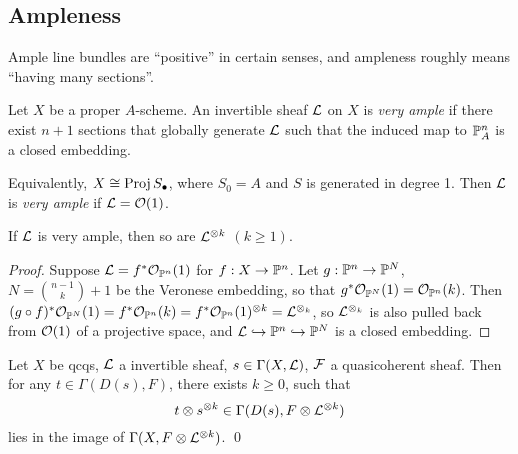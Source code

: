 \documentclass[11pt]{amsart}
\begin{document}
\subsection{Ampleness}

Ample line bundles are ``positive'' in certain senses, and ampleness roughly means ``having many sections''.

\begin{defn}
    Let $X$ be a proper $A$-scheme. An invertible sheaf $\mathcal{L}$ on $X$ is \emph{very ample} if there exist $n+1$ sections that globally generate $\mathcal{L}$ such that the induced map to $\mathbb{P}^n_A$ is a closed embedding. 
    
    Equivalently, $X \cong \operatorname{Proj} S_\bullet$, where $S_0=A$ and $S$ is generated in degree 1. Then $\mathcal{L}$ is \emph{very ample} if $\mathcal{L} = \mathcal{O}(1)$.
\end{defn}


\begin{prop}
    If $\mathcal{L}$ is very ample, then so are $\mathcal{L}^{\otimes k}$ $(k\ge 1)$.
\end{prop}

\begin{proof}
    Suppose $\mathcal{L} = f^\ast \mathcal{O}_{\mathbb{P}^n}(1)$ for $f:X\to \mathbb{P}^n$. Let $g: \mathbb{P}^n\to \mathbb{P}^{N}$, $N=\binom{n-1}{k}+1$ be the Veronese embedding, so that $g^\ast\mathcal{O}_{\mathbb{P}^N}(1) = \mathcal{O}_{\mathbb{P}^n}(k)$. Then $(g\circ f)^\ast \mathcal{O}_{\mathbb{P}^N}(1) = f^\ast \mathcal{O}_{\mathbb{P}^n}(k) = f^\ast \mathcal{O}_{\mathbb{P}^n}(1)^{\otimes k} = \mathcal{L}^{\otimes_k}$, so $\mathcal{L}^{\otimes_k}$ is also pulled back from $\mathcal{O}(1)$ of a projective space, and $\mathcal{L}\hookrightarrow \mathbb{P}^n\hookrightarrow \mathbb{P}^N$ is a closed embedding.
\end{proof}

\begin{lem}
\label{extendingSections}
    Let $X$ be qcqs, $\mathcal{L}$ a invertible sheaf, $s\in \Gamma(X,\mathcal{L})$, $\mathcal{F}$ a quasicoherent sheaf. Then for any $t\in \Gamma(D(s), F)$, there exists $k\ge 0$, such that
    \[t\otimes s^{\otimes k} \in \Gamma(D(s), F\otimes \mathcal{L}^{\otimes k})\]
    lies in the image of $\Gamma(X, F\otimes \mathcal{L}^{\otimes k})$. \qed
\end{lem}
\end{document}
